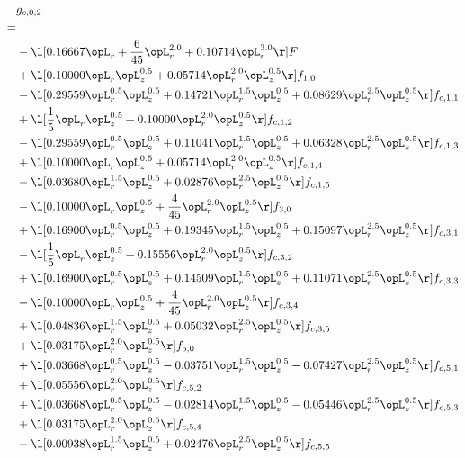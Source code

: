 \begin{alignat}{2} 
\label{eq:g_02_0} 
& g_{c,0,2} \nonumber \\ 
 = \\ 
& - \l[  0.16667 \opL_r + \frac{6}{45} \opL_r^{2.0} +  0.10714 \opL_r^{3.0}  \r] F \nonumber \\ 
& + \l[  0.10000 \opL_r \opL_z^{0.5} +  0.05714 \opL_r^{2.0} \opL_z^{0.5}  \r] f_{1,0} \nonumber \\ 
& - \l[  0.29559 \opL_r^{0.5} \opL_z^{0.5} +  0.14721 \opL_r^{1.5} \opL_z^{0.5} +  0.08629 \opL_r^{2.5} \opL_z^{0.5}  \r] f_{c,1,1} \nonumber \\ 
& + \l[ \frac{1}{5} \opL_r \opL_z^{0.5} +  0.10000 \opL_r^{2.0} \opL_z^{0.5}  \r] f_{c,1,2} \nonumber \\ 
& - \l[  0.29559 \opL_r^{0.5} \opL_z^{0.5} +  0.11041 \opL_r^{1.5} \opL_z^{0.5} +  0.06328 \opL_r^{2.5} \opL_z^{0.5}  \r] f_{c,1,3} \nonumber \\ 
& + \l[  0.10000 \opL_r \opL_z^{0.5} +  0.05714 \opL_r^{2.0} \opL_z^{0.5}  \r] f_{c,1,4} \nonumber \\ 
& - \l[  0.03680 \opL_r^{1.5} \opL_z^{0.5} +  0.02876 \opL_r^{2.5} \opL_z^{0.5}  \r] f_{c,1,5} \nonumber \\ 
& - \l[  0.10000 \opL_r \opL_z^{0.5} + \frac{4}{45} \opL_r^{2.0} \opL_z^{0.5}  \r] f_{3,0} \nonumber \\ 
& + \l[  0.16900 \opL_r^{0.5} \opL_z^{0.5} +  0.19345 \opL_r^{1.5} \opL_z^{0.5} +  0.15097 \opL_r^{2.5} \opL_z^{0.5}  \r] f_{c,3,1} \nonumber \\ 
& - \l[ \frac{1}{5} \opL_r \opL_z^{0.5} +  0.15556 \opL_r^{2.0} \opL_z^{0.5}  \r] f_{c,3,2} \nonumber \\ 
& + \l[  0.16900 \opL_r^{0.5} \opL_z^{0.5} +  0.14509 \opL_r^{1.5} \opL_z^{0.5} +  0.11071 \opL_r^{2.5} \opL_z^{0.5}  \r] f_{c,3,3} \nonumber \\ 
& - \l[  0.10000 \opL_r \opL_z^{0.5} + \frac{4}{45} \opL_r^{2.0} \opL_z^{0.5}  \r] f_{c,3,4} \nonumber \\ 
& + \l[  0.04836 \opL_r^{1.5} \opL_z^{0.5} +  0.05032 \opL_r^{2.5} \opL_z^{0.5}  \r] f_{c,3,5} \nonumber \\ 
& + \l[  0.03175 \opL_r^{2.0} \opL_z^{0.5}  \r] f_{5,0} \nonumber \\ 
& + \l[  0.03668 \opL_r^{0.5} \opL_z^{0.5}   -0.03751 \opL_r^{1.5} \opL_z^{0.5}   -0.07427 \opL_r^{2.5} \opL_z^{0.5}  \r] f_{c,5,1} \nonumber \\ 
& + \l[  0.05556 \opL_r^{2.0} \opL_z^{0.5}  \r] f_{c,5,2} \nonumber \\ 
& + \l[  0.03668 \opL_r^{0.5} \opL_z^{0.5}   -0.02814 \opL_r^{1.5} \opL_z^{0.5}   -0.05446 \opL_r^{2.5} \opL_z^{0.5}  \r] f_{c,5,3} \nonumber \\ 
& + \l[  0.03175 \opL_r^{2.0} \opL_z^{0.5}  \r] f_{c,5,4} \nonumber \\ 
& - \l[  0.00938 \opL_r^{1.5} \opL_z^{0.5} +  0.02476 \opL_r^{2.5} \opL_z^{0.5}  \r] f_{c,5,5} \nonumber \\ 
\end{alignat} 



